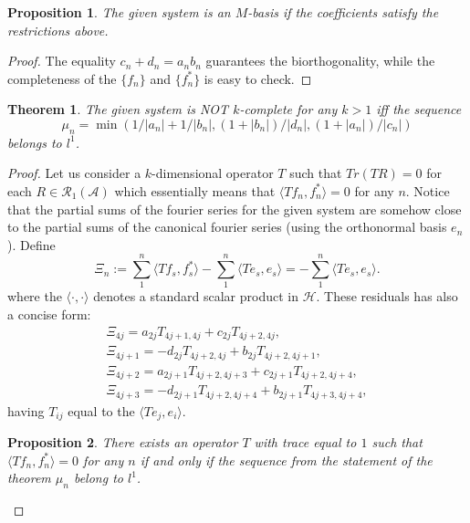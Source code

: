 \documentclass[12pt]{article}
\renewcommand{\cal}[1]{\mathcal{#1}}
\newtheorem{theorem}{Theorem}
\newtheorem{prop}{Proposition}
\theoremstyle{definition}
\numberwithin{remark}{section}
\numberwithin{theorem}{section}
\numberwithin{prop}{section}
\numberwithin{equation}{section}
\numberwithin{lemma}{section}
\numberwithin{prop_under_lemma}{lemma}
\begin{document}
    \pagebreak
    \begin{prop}
        The given system is an $M$-basis if the coefficients satisfy the restrictions above.
    \end{prop}
    \begin{proof}
        The equality $c_n + d_n = a_n b_n$ guarantees the bi\-orthogonality,
        while the completeness of the $\{f_n\}$ and $\{f_n^*\}$ is
        easy to check.
    \end{proof}
    
    \begin{theorem}
        The given system is NOT $k$-complete for any $k > 1$ iff the sequence
        $$
            \mu_n = \min(1/|a_n| + 1/|b_n|, (1 + |b_n|)/|d_n|, (1 + |a_n|)/|c_n|)
        $$ belongs to $l^1$.
    \end{theorem}
    \begin{proof}
        Let us consider a $k$-dimensional operator $T$ such that 
        $Tr(TR) = 0$ for each $R \in \cal{R}_1(\cal{A})$ which essentially means that
        $\langle Tf_n, f_n^* \rangle = 0$ for any $n$. 
        Notice that the partial sums of the fourier series for the given system are somehow close to the
        partial sums of the canonical fourier series (using the orthonormal basis $e_n$). Define
        $$
          \Xi_n := \sum_1^n \langle Tf_s, f_s^* \rangle - \sum_1^n \langle Te_s, e_s \rangle = -\sum_1^n \langle Te_s, e_s \rangle.
        $$
        where the $\langle \cdot, \cdot\rangle$ denotes a standard scalar product in $\cal{H}$.
        These residuals has also a concise form:
        \begin{align*}
            \Xi_{4j} = a_{2j} T_{4j+1, 4j} + c_{2j} T_{4j+2, 4j},\\
            \Xi_{4j + 1} = -d_{2j} T_{4j+2, 4j} + b_{2j} T_{4j+2, 4j+1},\\
            \Xi_{4j + 2} = a_{2j+1} T_{4j+2, 4j+3} + c_{2j+1} T_{4j+2, 4j+4},\\
            \Xi_{4j + 3} = -d_{2j+1} T_{4j+2, 4j+4} + b_{2j+1} T_{4j+3, 4j+4},
        \end{align*}
        having $T_{ij}$ equal to the $\langle Te_j, e_i\rangle$.
        \begin{prop}
            \label{inf-dim-statement}
            There exists an operator $T$ with trace equal to $1$ such that
            $\langle Tf_n, f_n^*\rangle = 0$ for any $n$ if and only if the
            sequence from the statement of the theorem $\mu_n$ belong to $l^1$.
        \end{prop}

\end{proof}
\end{document}
